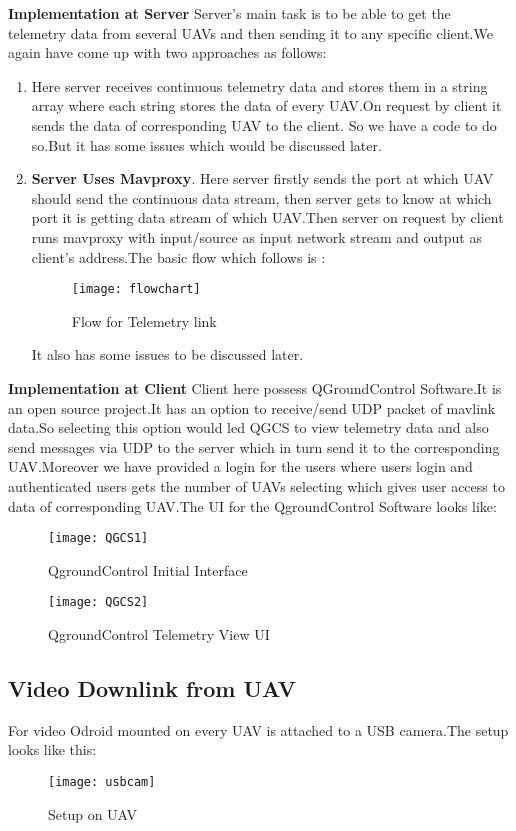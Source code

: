 \documentclass[12pt]{article}
\begin{document}
{\bf Implementation at Server}
Server's main task is to be able to get the telemetry data from several UAVs and then sending it to any specific client.We again have come up with two approaches as follows:
\begin{enumerate}
\item Here server receives continuous telemetry data and stores them in a string array where each string stores the data of every UAV.On request by client it sends the data of corresponding UAV to the client.
So we have a code to do so.But it has some issues which would be discussed later.
\item {\bf Server Uses Mavproxy}. Here server firstly sends the port at which UAV should send the continuous data stream, then server gets to know at which port it is getting data stream of which UAV.Then server on request by client runs mavproxy with input/source as input network stream and output as client's address.The basic flow which follows is :\newpage
\begin{figure}[ht!]
\centering
\texttt{[image: flowchart]}
\caption{Flow for Telemetry link}
\label{overflow}
\end{figure}
It also has some issues to be discussed later.
\end{enumerate}
\newpage
{\bf Implementation at Client}
\newline Client here possess QGroundControl Software.It is an open source project.It has an option to receive/send UDP packet of mavlink data.So selecting this option would led QGCS to view telemetry data and also send messages via UDP to the server which in turn send it to the corresponding UAV.\newline Moreover we have provided a login for the users where users login and authenticated users gets the number of UAVs selecting which gives user access to data of corresponding UAV.The UI for the QgroundControl Software looks like:\newline

\begin{figure}[ht!]
\centering
\texttt{[image: QGCS1]}
\caption{QgroundControl Initial Interface}
\label{overflow}
\end{figure}
\newpage
\begin{figure}[ht!]
\centering
\texttt{[image: QGCS2]}
\caption{QgroundControl Telemetry View UI}
\label{overflow}
\end{figure}


\subsection{Video Downlink from UAV}
For video Odroid mounted on every UAV is attached to a USB camera.The setup looks like this:
\begin{figure}[ht!]
\centering
\texttt{[image: usbcam]}
\caption{Setup on UAV}
\label{overflow}
\end{figure}
\newpage
\end{document}
